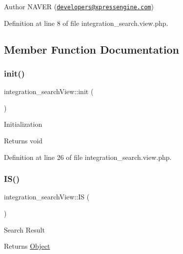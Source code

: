 \begin{DoxyAuthor}{Author}
N\+A\+V\+ER (\href{mailto:developers@xpressengine.com}{\tt developers@xpressengine.\+com}) 
\end{DoxyAuthor}


Definition at line 8 of file integration\+\_\+search.\+view.\+php.



\subsection{Member Function Documentation}
\mbox{\label{classintegration__searchView_aeed621ea43574fc7b4c5d650d1d698b6}} 
\subsubsection{\texorpdfstring{init()}{init()}}
{\footnotesize\ttfamily integration\+\_\+search\+View\+::init (\begin{DoxyParamCaption}{ }\end{DoxyParamCaption})}

Initialization

\begin{DoxyReturn}{Returns}
void 
\end{DoxyReturn}


Definition at line 26 of file integration\+\_\+search.\+view.\+php.

\mbox{\label{classintegration__searchView_a271296176ae955cb88c55c5eac511a23}} 
\subsubsection{\texorpdfstring{I\+S()}{IS()}}
{\footnotesize\ttfamily integration\+\_\+search\+View\+::\+IS (\begin{DoxyParamCaption}{ }\end{DoxyParamCaption})}

Search Result

\begin{DoxyReturn}{Returns}
\hyperlink{classObject}{Object} 
\end{DoxyReturn}


